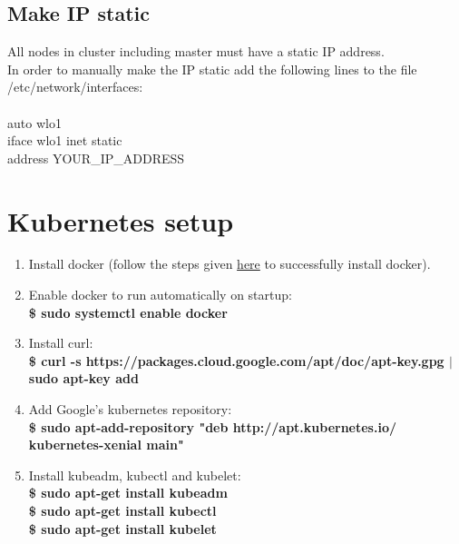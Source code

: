 \documentclass[12pt]{report}
\begin{document}
\subsection{Make IP static}
All nodes in cluster including master must have a static IP address.\\
In order to manually make the IP static add the following lines to the file /etc/network/interfaces:\\\\
auto wlo1\\
iface wlo1 inet static\\
address  YOUR\_IP\_ADDRESS
\section{Kubernetes setup}
\begin{enumerate}
	\item Install docker (follow the steps given \hyperref[sec:dockerinstall]{here} to successfully install docker).
	\item Enable docker to run automatically on startup:\\
	\textbf{\$ sudo systemctl enable docker}
	\item Install curl:\\
	\textbf{\$ curl -s https://packages.cloud.google.com/apt/doc/apt-key.gpg $\vert$ sudo apt-key add}
	\item Add Google’s kubernetes repository:\\
	\textbf{\$ sudo apt-add-repository "deb http://apt.kubernetes.io/ kubernetes-xenial main"}
	\item Install kubeadm, kubectl and kubelet:\\
	\textbf{\$ sudo apt-get install kubeadm}\\
	\textbf{\$ sudo apt-get install kubectl}\\
	\textbf{\$ sudo apt-get install kubelet}
\end{enumerate}
\end{document}
